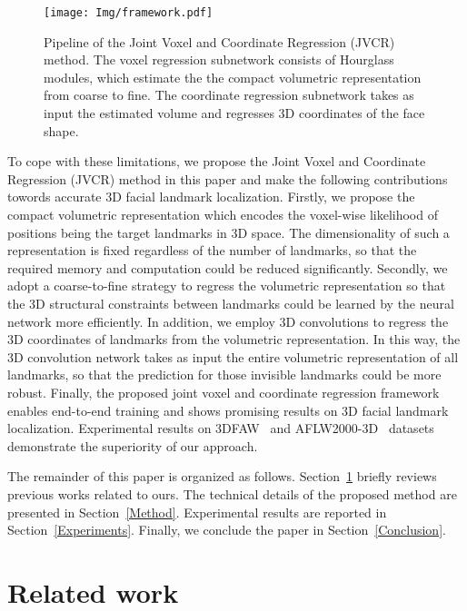 \documentclass[a4paper,conference]{IEEEtran}
\begin{document}
\begin{figure*}[t]
	\begin{center}
		\texttt{[image: Img/framework.pdf]}
		\caption{Pipeline of the Joint Voxel and Coordinate Regression (JVCR) method. The voxel regression subnetwork  consists of  Hourglass modules, which estimate the the compact volumetric representation from coarse to fine. The coordinate regression subnetwork  takes as input the estimated volume and regresses 3D coordinates of the face shape.
		}
		\label{fig:framework}
	\end{center}
\end{figure*}


To cope with these limitations, we propose the Joint Voxel and Coordinate Regression (JVCR) method in this paper and make the following contributions towords accurate 3D facial landmark localization.
Firstly, we propose the compact volumetric representation which encodes the voxel-wise likelihood of positions being the target landmarks in 3D space.
The dimensionality of such a representation is fixed regardless of the number of landmarks, so that the required memory and computation could be reduced significantly.
Secondly, we adopt a coarse-to-fine strategy to regress the volumetric representation so that the 3D structural constraints between landmarks could be learned by the neural network more efficiently.
In addition, we employ 3D convolutions to regress the 3D coordinates of landmarks from the volumetric representation.
In this way, the 3D convolution network takes as input the entire volumetric representation of all landmarks, so that the prediction for those invisible landmarks could be more robust.
Finally, the proposed joint voxel and coordinate regression framework enables end-to-end training and shows promising results on 3D facial landmark localization.
Experimental results on 3DFAW~\cite{jeni2016first} and AFLW2000-3D~\cite{zhu2016face} datasets demonstrate the superiority of our approach.

The remainder of this paper is organized as follows. Section~\ref{RelatedWork} briefly reviews previous works related to ours.
The technical details of the proposed method are presented in Section~\ref{Method}.
Experimental results are reported in Section~\ref{Experiments}.
Finally, we conclude the paper in Section~\ref{Conclusion}.



\section{Related work}
\label{RelatedWork}
\end{document}
